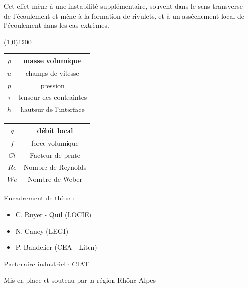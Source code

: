 \documentclass[a0,portrait]{a0poster}
\begin{document}
\begin{multicols}{2}
\begin{multicols}{2}
        Cet effet mène à une instabilité supplémentaire, souvent dans le sens transverse de l'écoulement et mène à la formation de rivulets, et à un assèchement local de l'écoulement dans les cas extrèmes.

    \end{multicols}

\end{multicols}

\begin{center}
    \line(1,0){1500}
\end{center}

\begin{multicols}{2}
    \begin{center}
        \begin{tabular}{|c|c|}
            \hline $\rho$ & masse volumique \\
            \hline $u$ & champs de vitesse \\
            \hline $p$ & pression \\
            \hline $\tau$ & tenseur des contraintes \\
            \hline $h$ & hauteur de l'interface \\
            \hline
        \end{tabular}
        \begin{tabular}{|c|c|}
            \hline $q$ & débit local \\
            \hline $f$ & force volumique \\
            \hline $Ct$ & Facteur de pente \\
            \hline $Re$ & Nombre de Reynolds \\
            \hline $W\!e$ & Nombre de Weber \\
            \hline
        \end{tabular}
    \end{center}

        Encadrement de thèse :
        \begin{itemize}
            \item C. Ruyer - Quil (LOCIE)
            \item N. Caney (LEGI)
            \item P. Bandelier (CEA - Liten)
        \end{itemize}

        Partenaire industriel : CIAT

        Mis en place et soutenu par la région Rhône-Alpes
\end{multicols}
\end{document}
